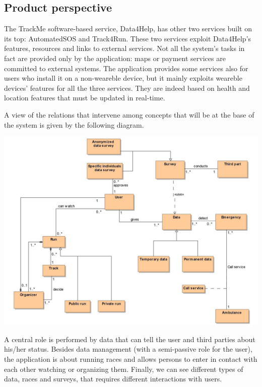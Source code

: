 
%

\subsection{Product perspective}
The TrackMe software-based service, Data4Help, has  other two services built on its top: AutomatedSOS and Track4Run. These two services exploit Data4Help's features, resources and links to external services. Not all the system's tasks in fact are provided only by the application: maps or payment services are committed to external systems. The application provides some services also for users who install it on a non-weareble device, but it mainly exploits weareble devices' features for all the three services. They are indeed based on health and location features that must be updated in real-time.\newline

A view of the relations that intervene among concepts that will be at the base of the system is given by the following diagram.\newline

\begin{center}
\includegraphics[scale=1]{sections/diagrams/class_diagram.jpg}
\end{center}

A central role is performed by data that can tell the user and third parties about his/her status. Besides data management (with a semi-passive role for the user), the application is about running races and allows persons to enter in contact with each other watching or organizing them. Finally, we can see different types of data, races and surveys, that requires different interactions with users.

